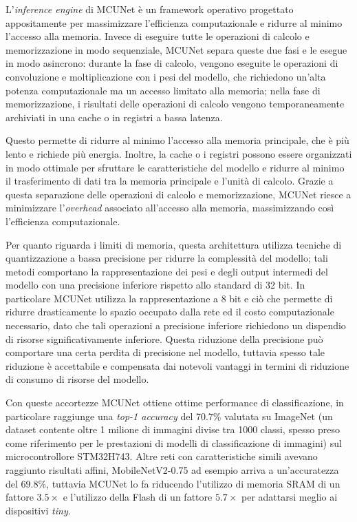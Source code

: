 L'\textit{inference engine} di MCUNet è un framework operativo progettato appositamente per massimizzare l'efficienza computazionale e ridurre al minimo l'accesso alla memoria. 
Invece di eseguire tutte le operazioni di calcolo e memorizzazione in modo sequenziale, MCUNet separa queste due fasi e le esegue in modo asincrono: durante la fase di calcolo, vengono eseguite le operazioni di convoluzione e moltiplicazione con i pesi del modello, che richiedono un'alta potenza computazionale ma un accesso limitato alla memoria;
nella fase di memorizzazione, i risultati delle operazioni di calcolo vengono temporaneamente archiviati in una cache o in registri a bassa latenza. 

Questo permette di ridurre al minimo l'accesso alla memoria principale, che è più lento e richiede più energia. Inoltre, la cache o i registri possono essere organizzati in modo ottimale per sfruttare le caratteristiche del modello e ridurre al minimo il trasferimento di dati tra la memoria principale e l'unità di calcolo.
Grazie a questa separazione delle operazioni di calcolo e memorizzazione, MCUNet riesce a minimizzare l'\textit{overhead} associato all'accesso alla memoria, massimizzando così l'efficienza computazionale.

Per quanto riguarda i limiti di memoria, questa architettura utilizza tecniche di quantizzazione a bassa precisione per ridurre la complessità del modello; tali metodi comportano la rappresentazione dei pesi e degli output intermedi del modello con una precisione inferiore rispetto allo standard di 32 bit.
In particolare MCUNet utilizza la rappresentazione a 8 bit e ciò che permette di ridurre drasticamente lo spazio occupato dalla rete ed il costo computazionale necessario, dato che tali operazioni a precisione inferiore richiedono un dispendio di risorse significativamente inferiore.
Questa riduzione della precisione può comportare una certa perdita di precisione nel modello, tuttavia spesso tale riduzione è accettabile e compensata dai notevoli vantaggi in termini di riduzione di consumo di risorse del modello. 

Con queste accortezze MCUNet ottiene ottime performance di classificazione, in particolare raggiunge una \textit{top-1 accuracy} del 70.7\% valutata su ImageNet (un dataset contente oltre 1 milione di immagini divise tra 1000 classi, spesso preso come riferimento per le prestazioni di modelli di classificazione di immagini) sul microcontrollore STM32H743. Altre reti con caratteristiche simili avevano raggiunto risultati affini, MobileNetV2-0.75 ad esempio arriva a un'accuratezza del 69.8\%, tuttavia MCUNet lo fa riducendo l'utilizzo di memoria SRAM di un fattore $3.5\times$ e l'utilizzo della Flash di un fattore $5.7\times$ per adattarsi meglio ai dispositivi \textit{tiny}.

